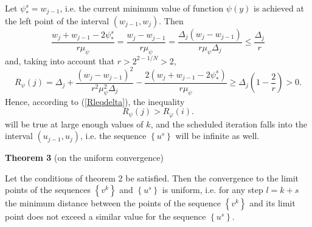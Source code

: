 \documentclass[smallcondensed]{svjour3}     %
\begin{document}
Let $\psi_\ast^s=w_{j-1}$, i.e. the current minimum value of function $\psi(y)$ is achieved at the left point of the interval $(w_{j-1},w_j)$. Then 
\[
\frac{w_j+w_{j-1}-2\psi_\ast^s}{r\mu_\psi}=\frac{w_j-w_{j-1}}{r\mu_\psi} = \frac{\Delta_j(w_j-w_{j-1})}{r\mu_\psi \Delta_j}\leq \frac{\Delta_j}{r}
\]
and, taking into account that $r>2^{2-1/N}>2$,
\[
R_\psi(j)=\Delta_j+\frac{(w_j-w_{j-1})^2}{r^2\mu_\psi^2\Delta_j}-\frac{2(w_j+w_{j-1}-2\psi_\ast^s)}{r\mu_\psi} \geq \Delta_j\left(1-\frac{2}{r}\right) > 0.
\]
Hence, according to (\ref{Rleqdelta}), the inequality 
\[
R_\psi(j) > R_\varphi(i).
\]
will be true at large enough values of $k$, and the scheduled iteration falls into the interval $(u_{j-1},u_j)$, i.e. the sequence $\left\{u^s\right\}$ will be infinite as well.

\textbf{Theorem 3} (on the uniform convergence)

Let the conditions of theorem 2 be satisfied. Then the convergence to the limit points of the sequences $\left\{v^k\right\}$ and $\left\{u^s\right\}$ is uniform,
i.e. for any step $l=k+s$  the minimum distance between the points of the sequence $\left\{v^k\right\}$ and its limit point does not exceed a similar value for the sequence $\left\{u^s\right\}$. 
\end{document}
